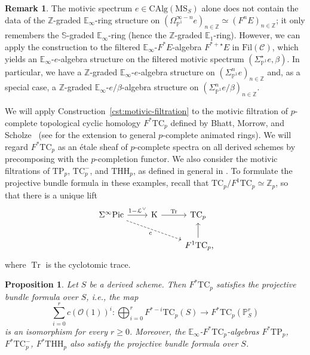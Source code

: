 \documentclass{amsart}
\numberwithin{equation}{section}
\theoremstyle{plain}
\newtheorem{proposition}[equation]{Proposition}
\theoremstyle{definition}
\newtheorem{remark}[equation]{Remark}
\let\scr=\mathcal
\let\bb=\mathbb
\def\Z{\bb Z}
\def\P{\bb P}
\def\Pic{\mathrm{Pic}}
\def\E{\mathbb{E}}
\def\THH{\mathrm{THH}}
\DeclareMathOperator{\Tr}{Tr}
\def\K{\mathrm{K}{}}
\def\Fil{\mathrm{Fil}}
\def\MS{\mathrm{MS}}
\def\CAlg{\mathrm{CAlg}{}}
\newcommand{\TC}{\mathrm{TC}}
\newcommand{\TP}{\mathrm{TP}}
\begin{document}
\begin{remark}\label{rmk:filtered-E-infinity}
	The motivic spectrum $e\in\CAlg(\MS_S)$ alone does not contain the data of the $\Z$-graded $\E_\infty$-ring structure on $(\Omega_{\P^1}^{\infty-n}e)_{n\in \Z}\simeq (F^nE)_{n\in \Z}$; it only remembers the $\mathbb S$-graded $\E_\infty$-ring (hence the $\Z$-graded $\E_1$-ring).
	 However, we can apply the construction to the filtered $\E_\infty$-$F^*E$-algebra $F^{*+\star}E$ in $\Fil(\scr C)$, which yields an $\E_\infty$-$e$-algebra structure on the filtered motivic spectrum $(\Sigma_{\P^1}^\star e,\beta)$. 
	 In particular, we have a $\Z$-graded $\E_\infty$-$e$-algebra structure on $(\Sigma_{\P^1}^ne)_{n\in\Z}$ and, as a special case, a $\Z$-graded $\E_\infty$-$e/\beta$-algebra structure on $(\Sigma_{\P^1}^ne/\beta)_{n\in\Z}$.
\end{remark}


We will apply Construction~\ref{cst:motivic-filtration} to the motivic filtration of $p$-complete topological cyclic homology $F^*\TC_p$ defined by Bhatt, Morrow, and Scholze~\cite[Theorem 1.12]{BMS} (see \cite[Construction 5.33]{AMMN} for the extension to general $p$-complete animated rings).
We will regard $F^*\TC_p$ as an étale sheaf of $p$-complete spectra on all derived schemes by precomposing with the $p$-completion functor.
We also consider the motivic filtrations of $\TP_p$, $\TC_p^-$, and $\THH_p$, as defined in general in \cite[Section 6.2]{BhattLurie}.
To formulate the projective bundle formula in these examples, recall that $\TC_p/F^1\TC_p\simeq \Z_p$, so that there is a unique lift
\[
\begin{tikzcd}
	\Sigma^\infty\Pic \ar{r}{1-\scr L^\vee} \ar[dashed]{drr}[swap]{c} &  \K \ar{r}{\mathrm{Tr}} & \TC_p \\
	& & F^1\TC_p\rlap, \ar{u}
\end{tikzcd}
\]
where $\Tr$ is the cyclotomic trace.

\begin{proposition}\label{prop:filtered-PBF-TC}
Let $S$ be a derived scheme. 
Then $F^*\TC_p$ satisfies the projective bundle formula over $S$, i.e., the map
\[
	\sum_{i=0}^r c(\scr O(1))^{i} \colon \bigoplus_{i=0}^r F^{*-i}\TC_p(S) \to F^*\TC_p(\P^r_S)
\]
is an isomorphism for every $r\ge 0$. 
Moreover, the $\E_\infty$-$F^*\TC_p$-algebras $F^*\TP_p$, $F^*\TC_p^-$, $F^*\THH_p$ also satisfy the projective bundle formula over $S$.
\end{proposition}
\end{document}
